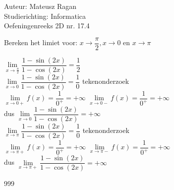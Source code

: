 \documentclass[a4paper]{article}
\begin{document}
\noindent \large Auteur: Mateusz Ragan \\
\noindent \large Studierichting: Informatica\\
\noindent \large Oefeningenreeks 2D nr. 17.4\\

\medskip

\normalsize

Bereken het limiet voor: $x\rightarrow\dfrac{\pi}{2}, x\rightarrow 0$ en $x\rightarrow \pi$

$\lim\limits_{x\rightarrow \tfrac{\pi}{2}} \dfrac{1-\sin(2x)}{1-\cos(2x)} = \dfrac{1}{2}$\\

$\lim\limits_{x\rightarrow 0} \dfrac{1-\sin(2x)}{1-\cos(2x)} = \dfrac{1}{0}$ tekenonderzoek \\

$\lim\limits_{x\rightarrow 0+} f(x) = \dfrac{1}{0^+} = +\infty$ $\lim\limits_{x\rightarrow 0-} f(x) = \dfrac{1}{0^+} = +\infty$\\

dus $\lim\limits_{x\rightarrow 0} \dfrac{1-\sin(2x)}{1-\cos(2x)} = +\infty$\\

$\lim\limits_{x\rightarrow \pi} \dfrac{1-\sin(2x)}{1-\cos(2x)} = \dfrac{1}{0}$ tekenonderzoek\\

$\lim\limits_{x\rightarrow \pi+} f(x) = \dfrac{1}{0^+} = +\infty$ $\lim\limits_{x\rightarrow \pi-} f(x) = \dfrac{1}{0^+} = +\infty$\\

dus $\lim\limits_{x\rightarrow \pi+} \dfrac{1-\sin(2x)}{1-\cos(2x)} = +\infty$





\begin{thebibliography}{999}
\end{thebibliography}
\end{document}
